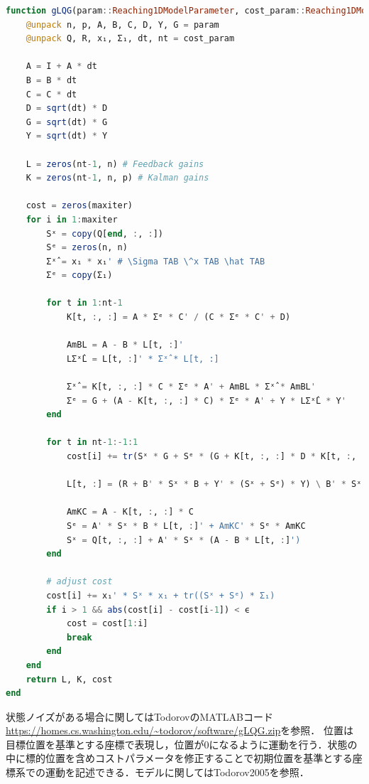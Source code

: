 \begin{lstlisting}[language=julia]
function gLQG(param::Reaching1DModelParameter, cost_param::Reaching1DModelCostParameter, maxiter=200, ϵ=1e-8)
    @unpack n, p, A, B, C, D, Y, G = param
    @unpack Q, R, x₁, Σ₁, dt, nt = cost_param

    A = I + A * dt
    B = B * dt
    C = C * dt
    D = sqrt(dt) * D
    G = sqrt(dt) * G
    Y = sqrt(dt) * Y
    
    L = zeros(nt-1, n) # Feedback gains
    K = zeros(nt-1, n, p) # Kalman gains
    
    cost = zeros(maxiter)
    for i in 1:maxiter
        Sˣ = copy(Q[end, :, :])
        Sᵉ = zeros(n, n)
        Σˣ̂ = x₁ * x₁' # \Sigma TAB \^x TAB \hat TAB
        Σᵉ = copy(Σ₁)
        
        for t in 1:nt-1
            K[t, :, :] = A * Σᵉ * C' / (C * Σᵉ * C' + D)

            AmBL = A - B * L[t, :]'
            LΣˣ̂L = L[t, :]' * Σˣ̂ * L[t, :]

            Σˣ̂ = K[t, :, :] * C * Σᵉ * A' + AmBL * Σˣ̂ * AmBL'
            Σᵉ = G + (A - K[t, :, :] * C) * Σᵉ * A' + Y * LΣˣ̂L * Y'
        end
        
        for t in nt-1:-1:1
            cost[i] += tr(Sˣ * G + Sᵉ * (G + K[t, :, :] * D * K[t, :, :]'))
            
            L[t, :] = (R + B' * Sˣ * B + Y' * (Sˣ + Sᵉ) * Y) \ B' * Sˣ * A

            AmKC = A - K[t, :, :] * C
            Sᵉ = A' * Sˣ * B * L[t, :]' + AmKC' * Sᵉ * AmKC
            Sˣ = Q[t, :, :] + A' * Sˣ * (A - B * L[t, :]')
        end
        
        # adjust cost
        cost[i] += x₁' * Sˣ * x₁ + tr((Sˣ + Sᵉ) * Σ₁)
        if i > 1 && abs(cost[i] - cost[i-1]) < ϵ
            cost = cost[1:i]
            break
        end
    end
    return L, K, cost
end
\end{lstlisting}
状態ノイズがある場合に関してはTodorovのMATLABコード \url{https://homes.cs.washington.edu/~todorov/software/gLQG.zip}を参照．
位置は目標位置を基準とする座標で表現し，位置が0になるように運動を行う．状態の中に標的位置を含めコストパラメータを修正することで初期位置を基準とする座標系での運動を記述できる．モデルに関してはTodorov2005を参照．
